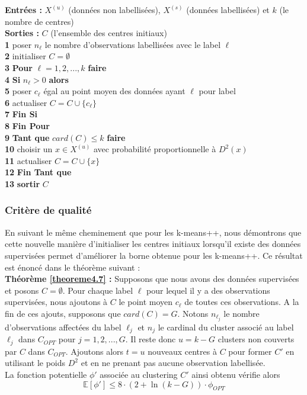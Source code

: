 \documentclass[12pt,a4paper]{book}
\newcommand{\E}{\mathbb{E}}
\newcommand{\1}{\mathds{1}}
\begin{document}
\noindent \textbf{Entrées : } $X^{(u)}$ (données non labellisées), $X^{(s)}$ (données labellisées) et $k$ (le nombre de centres)\\
\noindent \textbf{Sorties : } $C$ (l'ensemble des centres initiaux) \\
\textbf{1} poser $n_{\ell}$ le nombre d'observations labellisées avec le label $\ell$\\
\textbf{2} initialiser $C=\emptyset$\\
\textbf{3} \textbf{Pour} $\ell = 1,2,...,k$ \textbf{faire} \\
\textbf{4} \indent \textbf{Si} $n_{\ell} > 0$ \textbf{alors}\\
\textbf{5} \indent \indent poser $c_\ell$ égal au point moyen des données ayant $\ell$ pour label\\
\textbf{6} \indent \indent actualiser $C = C \cup \{c_\ell \}$\\
\textbf{7} \indent \textbf{Fin Si} \\
\textbf{8} \textbf{Fin Pour}\\
\textbf{9} \textbf{Tant que } $card(C) \leq k$ \textbf{faire}\\
\textbf{10} \indent choisir un $x \in X^{(u)}$ avec probabilité proportionnelle à $D^2(x)$\\
\textbf{11} \indent actualiser $C = C \cup \{x \}$\\
\textbf{12} \textbf{Fin Tant que}\\
\textbf{13} \textbf{sortir} $C$ \\

\subsubsection{Critère de qualité}

En suivant le même cheminement que pour les k-means++, nous démontrons que cette nouvelle manière d'initialiser les centres initiaux lorsqu'il existe des données supervisées permet d'améliorer la borne obtenue pour les k-means++. Ce résultat est énoncé dans le théorème suivant :\\

\noindent \textbf{Théorème \ref{theoreme4.7} : } Supposons que nous avons des données supervisées et posons $C = \emptyset$. Pour chaque label $\ell$ pour lequel il y a des observations supervisées, nous ajoutons à $C$ le point moyen $c_\ell$ de toutes ces observations. A la fin de ces ajouts, supposons que $card(C)=G$. Notons $n_{\ell_j}$ le nombre d'observations affectées du label $\ell_j$ et $n_j$ le cardinal du cluster associé au label $\ell_j$ dans $C_{OPT}$  pour $j = 1, 2, ..., G$. Il reste donc $u=k-G$ clusters non couverts par $C$ dans $C_{OPT}$. Ajoutons alors $t=u$ nouveaux centres à $C$ pour former $C'$ en utilisant le poids $D^2$ et en ne prenant pas aucune observation labellisée.\\
		La fonction potentielle $\phi'$ associée au clustering $C'$ ainsi obtenu vérifie alors
		$$
			\E[\phi'] \leq 8 \cdot \left(2 + \ln (k - G) \right) \cdot \phi_{OPT}
		$$  
\end{document}
